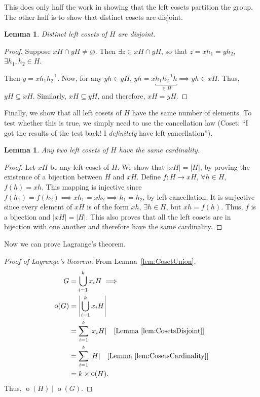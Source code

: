 \documentclass[svgnames]{article}
\newtheorem{Lemma}[Theorem]{Lemma}
\theoremstyle{definition}
\theoremstyle{remark}
\DeclareMathOperator{\ord}{o}
\begin{document}
This does only half the work in showing that the left cosets partition the group. The other half is to show that distinct cosets are disjoint.
\begin{Lemma}\label{lem:CosetsDisjoint}
Distinct left cosets of $H$ are disjoint.
\end{Lemma}
\begin{proof}
Suppose $xH \cap yH \ne \varnothing$. Then $\exists z \in xH \cap yH$, so that $z = xh_1 = yh_2$, $\exists h_1, h_2 \in H$.

Then $y = xh_1 h_2^{-1}$. Now, for any $yh \in yH$, $yh = x \underbracket{h_1h_2^{-1}h}_{\in H} \implies yh \in xH$. Thus, $yH \subseteq xH$. Similarly, $xH \subseteq yH$, and therefore, $xH = yH$.
\end{proof}

Finally, we show that all left cosets of $H$ have the same number of elements. To test whether this is true, we simply need to use the cancellation law (Coset: ``I got the results of the test back! I \emph{definitely} have left cancellation'').

\begin{Lemma}\label{lem:CosetsCardinality}
Any two left cosets of $H$ have the same cardinality.
\end{Lemma}
\begin{proof}
Let $xH$ be any left coset of $H$. We show that $|xH| = |H|$, by proving the existence of a bijection between $H$ and $xH$. Define $f \colon H \to xH$, $\forall h \in H$, $f(h) = xh$. This mapping is injective since $f(h_1) = f(h_2) \implies xh_1 = xh_2 \implies h_1 = h_2$, by left cancellation. It is surjective since every element of $xH$ is of the form $xh$, $\exists h \in H$, but $xh = f(h)$. Thus, $f$ is a bijection and $|xH| = |H|$. This also proves that all the left cosets are in bijection with one another and therefore have the same cardinality.
\end{proof}

Now we can prove Lagrange's theorem.
\begin{proof}[Proof of Lagrange's theorem]
From Lemma~\ref{lem:CosetUnion},
\begin{align*}
G &= \bigcup_{i = 1}^k x_i H \implies \\
\ord(G) &= \left| \bigcup_{i = 1}^k x_i H \right| \\
	&= \sum_{i = 1}^k |x_i H| \quad \text{[Lemma~\ref{lem:CosetsDisjoint}]} \\
	& = \sum_{i = 1}^k |H| \quad \text{[Lemma~\ref{lem:CosetsCardinality}]} \\
	& = k \times \ord(H).
\end{align*}
Thus, $\ord(H) \mid \ord(G)$.
\end{proof}
\end{document}
